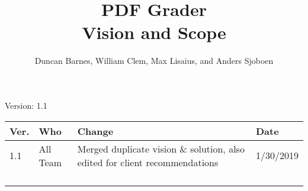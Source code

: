 \documentclass[letterpaper,12pt]{article}
\title{PDF Grader\\Vision and Scope}
\author{Duncan Barnes, William Clem, Max Lisaius, and Anders Sjoboen}
\begin{document}
\maketitle

\begin{center}
  Version: 1.1
\end{center}

\vfill
\begin{tabularx}{\linewidth}{|l|l|X|l|}\hline
Ver. & Who            & Change                              & Date      \\\hline
1.1  & All Team & Merged duplicate vision \& solution, also edited for client recommendations & 1/30/2019 \\\hline
     &                &                                     &           \\\hline
     &                &                                     &           \\\hline
     &                &                                     &           \\\hline
     &                &                                     &           \\\hline
\end{tabularx}
\newpage






\end{document}
